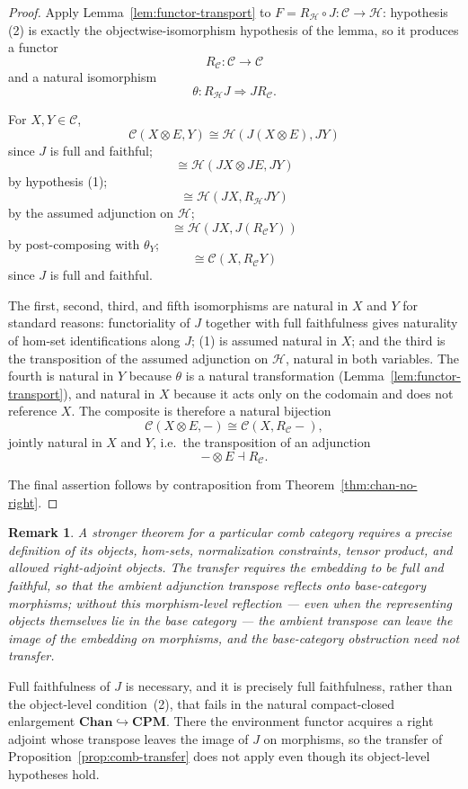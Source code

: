\documentclass[11pt]{article}
\newtheorem{remark}[theorem]{Remark}
\begin{document}
\begin{proof}
Apply Lemma~\ref{lem:functor-transport} to
$F=R_{\mathcal H}\circ J:\mathcal C\to\mathcal H$: hypothesis (2) is
exactly the objectwise-isomorphism hypothesis of the lemma, so it produces a
functor
\[
R_{\mathcal C}:\mathcal C\to\mathcal C
\]
and a natural isomorphism
\[
\theta:R_{\mathcal H}J\Rightarrow JR_{\mathcal C}.
\]

For $X,Y\in\mathcal C$,
\[
\mathcal C(X\otimes E,Y)
\cong
\mathcal H(J(X\otimes E),JY)
\]
since $J$ is full and faithful;
\[
\cong
\mathcal H(JX\otimes JE,JY)
\]
by hypothesis (1);
\[
\cong
\mathcal H(JX,R_{\mathcal H}JY)
\]
by the assumed adjunction on $\mathcal H$;
\[
\cong
\mathcal H(JX,J(R_{\mathcal C}Y))
\]
by post-composing with $\theta_Y$;
\[
\cong
\mathcal C(X,R_{\mathcal C}Y)
\]
since $J$ is full and faithful.

The first, second, third, and fifth isomorphisms are natural in $X$ and $Y$
for standard reasons: functoriality of $J$ together with full faithfulness
gives naturality of hom-set identifications along $J$; (1) is assumed
natural in $X$; and the third is the transposition of the assumed adjunction
on $\mathcal H$, natural in both variables. The fourth is natural in $Y$
because $\theta$ is a natural transformation
(Lemma~\ref{lem:functor-transport}), and natural in $X$ because it
acts only on the codomain and does not reference $X$. The composite is
therefore a natural bijection
\[
\mathcal C(X\otimes E,-)
\cong
\mathcal C(X,R_{\mathcal C}-),
\]
jointly natural in $X$ and $Y$, i.e.\ the transposition of an adjunction
\[
-\otimes E\dashv R_{\mathcal C}.
\]

The final assertion follows by contraposition from
Theorem~\ref{thm:chan-no-right}.
\end{proof}

\begin{remark}
A stronger theorem for a particular comb category requires a precise
definition of its objects, hom-sets, normalization constraints, tensor
product, and allowed right-adjoint objects. The transfer requires the embedding
to be full and faithful, so that the ambient adjunction transpose reflects onto
base-category morphisms; without this morphism-level reflection --- even when
the representing objects themselves lie in the base category --- the ambient
transpose can leave the image of the embedding on morphisms, and the
base-category obstruction need not transfer.
\end{remark}

Full faithfulness of $J$ is necessary, and it is precisely full faithfulness,
rather than the object-level condition~(2), that fails in the natural
compact-closed enlargement $\mathbf{Chan}\hookrightarrow\mathbf{CPM}$. There the
environment functor acquires a right adjoint whose transpose leaves the image
of $J$ on morphisms, so the transfer of Proposition~\ref{prop:comb-transfer}
does not apply even though its object-level hypotheses hold.
\end{document}
